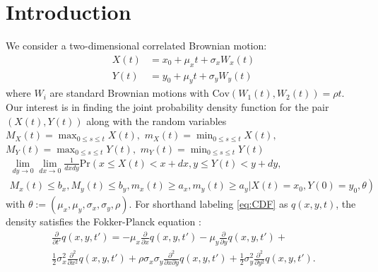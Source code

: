 \label{ch:galerkin}

\section{Introduction}

We consider a two-dimensional correlated Brownian motion:
\begin{align}
  X(t) &= x_0 + \mu_x t + \sigma_x W_x(t)  \label{eq:X} \\
  Y(t) &= y_0 + \mu_y t + \sigma_y W_y(t)  \label{eq:Y}
\end{align}
where $W_i$ are standard Brownian motions with
$\mbox{Cov}(W_1(t), W_2(t)) = \rho t$. Our interest is in finding the
joint probability density function for the pair $(X(t), Y(t))$
along with the random variables $M_X(t)=\max_{0\leq s\leq t}X(t),$
$m_X(t)=\min_{0\leq s\leq t}X(t),$ $M_Y(t)=\max_{0\leq s\leq t}Y(t),$
$m_Y(t)=\min_{0\leq s\leq t}Y(t)$
\begin{multline}
  \lim_{dy \to 0} \lim_{dx \to 0} \frac{1}{dx dy} \mbox{Pr}\left(x \leq X(t) < x+dx, y \leq Y(t) < y+dy, \right. \\
  \left. M_x(t) \leq b_x, M_y(t) \leq b_y, m_x(t) \geq a_x, m_y(t) \geq a_y | X(t) = x_0, Y(0) = y_0,
  \theta \right) \label{eq:CDF}
\end{multline}
with $\theta := (\mu_x, \mu_y, \sigma_x, \sigma_y, \rho).$ %
For shorthand labeling \eqref{eq:CDF} as $q(x,y,t)$, the density
satisfies the Fokker-Planck equation \cite{oksendal2013stochastic}:
\begin{multline}
  \displaystyle \frac{\partial}{\partial t'} q(x,y,t') = -\mu_x \frac{\partial}{\partial x}q(x,y,t')
  - \mu_y \frac{\partial}{\partial y}q(x,y,t') + \\
  \frac{1}{2}\sigma_x^2 \frac{\partial^2}{\partial x^2}q(x,y,t') + \rho\sigma_x\sigma_y \frac{\partial^2}{\partial x \partial y}q(x,y,t')
  + \frac{1}{2}\sigma_y^2 \frac{\partial^2}{\partial y^2}q(x,y,t'). \label{eq:1}
\end{multline}
